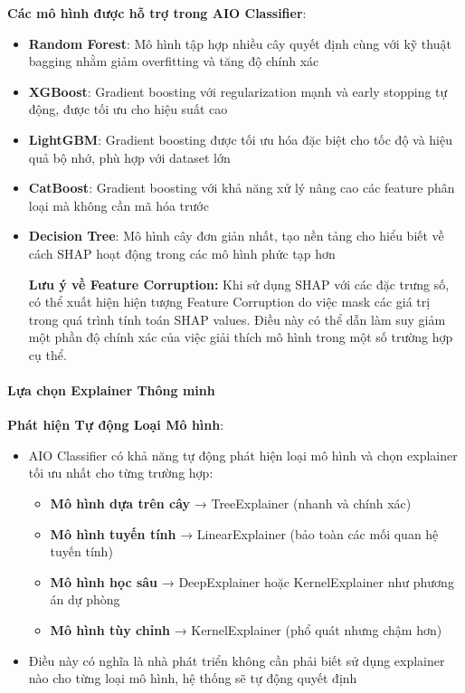 \textbf{Các mô hình được hỗ trợ trong AIO Classifier}:
\begin{itemize}[leftmargin=*]
    \item \textbf{Random Forest}: Mô hình tập hợp nhiều cây quyết định cùng với kỹ thuật bagging nhằm giảm overfitting và tăng độ chính xác
    
    \item \textbf{XGBoost}: Gradient boosting với regularization mạnh và early stopping tự động, được tối ưu cho hiệu suất cao
    
    \item \textbf{LightGBM}: Gradient boosting được tối ưu hóa đặc biệt cho tốc độ và hiệu quả bộ nhớ, phù hợp với dataset lớn
    
    \item \textbf{CatBoost}: Gradient boosting với khả năng xử lý nâng cao các feature phân loại mà không cần mã hóa trước
    
    \item \textbf{Decision Tree}: Mô hình cây đơn giản nhất, tạo nền tảng cho hiểu biết về cách SHAP hoạt động trong các mô hình phức tạp hơn
    
    \textbf{Lưu ý về Feature Corruption:} Khi sử dụng SHAP với các đặc trưng số, có thể xuất hiện hiện tượng Feature Corruption do việc mask các giá trị trong quá trình tính toán SHAP values. Điều này có thể dẫn làm suy giảm một phần độ chính xác của việc giải thích mô hình trong một số trường hợp cụ thể.
\end{itemize}

\paragraph{Lựa chọn Explainer Thông minh}

\textbf{Phát hiện Tự động Loại Mô hình}:
\begin{itemize}[leftmargin=*]
    \item AIO Classifier có khả năng tự động phát hiện loại mô hình và chọn explainer tối ưu nhất cho từng trường hợp:
    \begin{itemize}[leftmargin=*]
        \item \textbf{Mô hình dựa trên cây} → TreeExplainer (nhanh và chính xác)
        \item \textbf{Mô hình tuyến tính} → LinearExplainer (bảo toàn các mối quan hệ tuyến tính)
        \item \textbf{Mô hình học sâu} → DeepExplainer hoặc KernelExplainer như phương án dự phòng
        \item \textbf{Mô hình tùy chỉnh} → KernelExplainer (phổ quát nhưng chậm hơn)
    \end{itemize}
    
    \item Điều này có nghĩa là nhà phát triển không cần phải biết sử dụng explainer nào cho từng loại mô hình, hệ thống sẽ tự động quyết định
\end{itemize}

